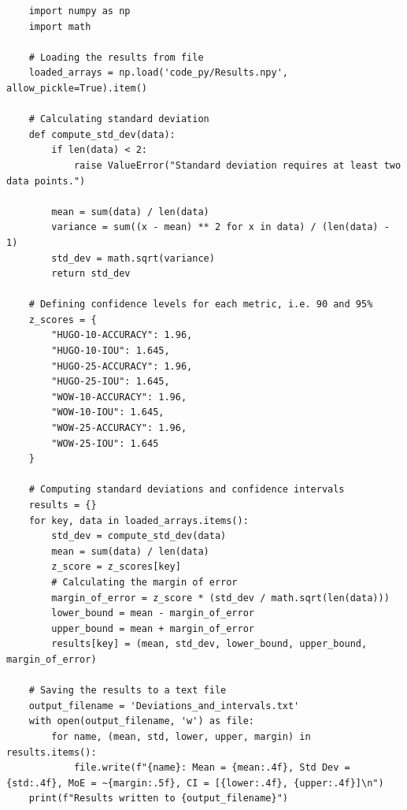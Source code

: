 \documentclass[12pt,a4paper]{article}
\begin{document}
\begin{lstlisting}
    import numpy as np
    import math
    
    # Loading the results from file
    loaded_arrays = np.load('code_py/Results.npy', allow_pickle=True).item()
    
    # Calculating standard deviation
    def compute_std_dev(data):
        if len(data) < 2:
            raise ValueError("Standard deviation requires at least two data points.")
        
        mean = sum(data) / len(data)
        variance = sum((x - mean) ** 2 for x in data) / (len(data) - 1)
        std_dev = math.sqrt(variance)
        return std_dev
    
    # Defining confidence levels for each metric, i.e. 90 and 95%
    z_scores = {
        "HUGO-10-ACCURACY": 1.96,
        "HUGO-10-IOU": 1.645,
        "HUGO-25-ACCURACY": 1.96,
        "HUGO-25-IOU": 1.645,
        "WOW-10-ACCURACY": 1.96,
        "WOW-10-IOU": 1.645,
        "WOW-25-ACCURACY": 1.96,
        "WOW-25-IOU": 1.645
    }
    
    # Computing standard deviations and confidence intervals
    results = {}
    for key, data in loaded_arrays.items():
        std_dev = compute_std_dev(data)
        mean = sum(data) / len(data)
        z_score = z_scores[key]
        # Calculating the margin of error
        margin_of_error = z_score * (std_dev / math.sqrt(len(data)))
        lower_bound = mean - margin_of_error
        upper_bound = mean + margin_of_error
        results[key] = (mean, std_dev, lower_bound, upper_bound, margin_of_error)
    
    # Saving the results to a text file
    output_filename = 'Deviations_and_intervals.txt'
    with open(output_filename, 'w') as file:
        for name, (mean, std, lower, upper, margin) in results.items():
            file.write(f"{name}: Mean = {mean:.4f}, Std Dev = {std:.4f}, MoE = ~{margin:.5f}, CI = [{lower:.4f}, {upper:.4f}]\n")
    print(f"Results written to {output_filename}")
\end{lstlisting}
\end{document}
